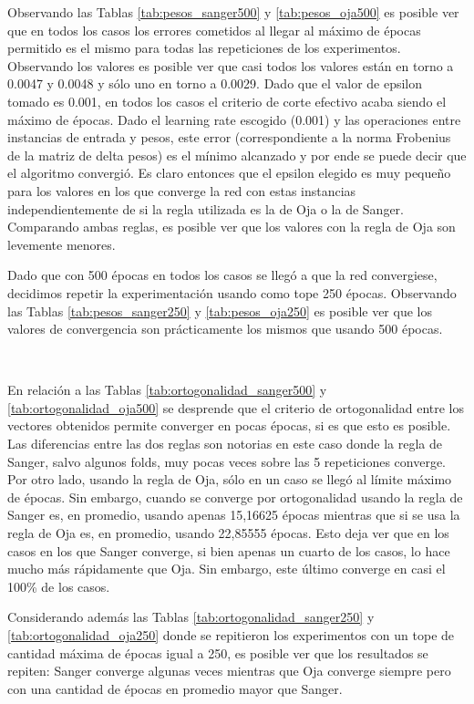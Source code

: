 \documentclass[informe.tex]{subfiles}
\begin{document}
	
	Observando las Tablas \ref{tab:pesos_sanger500} y \ref{tab:pesos_oja500} es posible ver que en todos los casos los errores cometidos al llegar al máximo de épocas permitido es el mismo para todas las repeticiones de los experimentos. Observando los valores es posible ver que casi todos los valores están en torno a 0.0047 y 0.0048 y sólo uno en torno a 0.0029. Dado que el valor de epsilon tomado es 0.001, en todos los casos el criterio de corte efectivo acaba siendo el máximo de épocas. Dado el learning rate escogido (0.001) y las operaciones entre instancias de entrada y pesos, este error (correspondiente a la norma Frobenius de la matriz de delta pesos) es el mínimo alcanzado y por ende se puede decir que el algoritmo convergió. Es claro entonces que el epsilon elegido es muy pequeño para los valores en los que converge la red con estas instancias independientemente de si la regla utilizada es la de Oja o la de Sanger. Comparando ambas reglas, es posible ver que los valores con la regla de Oja son levemente menores.
	
	Dado que con 500 épocas en todos los casos se llegó a que la red convergiese, decidimos repetir la experimentación usando como tope 250 épocas. Observando las Tablas \ref{tab:pesos_sanger250} y \ref{tab:pesos_oja250} es posible ver que los valores de convergencia son prácticamente los mismos que usando 500 \'epocas. 
	
	~
	
	En relación a las Tablas \ref{tab:ortogonalidad_sanger500} y \ref{tab:ortogonalidad_oja500} se desprende que el criterio de ortogonalidad entre los vectores obtenidos permite converger en pocas épocas, si es que esto es posible. Las diferencias entre las dos reglas son notorias en este caso donde la regla de Sanger, salvo algunos folds, muy pocas veces sobre las 5 repeticiones converge. Por otro lado, usando la regla de Oja, sólo en un caso se llegó al límite máximo de épocas. Sin embargo, cuando se converge por ortogonalidad usando la regla de Sanger es, en promedio, usando apenas 15,16625 épocas mientras que si se usa la regla de Oja es, en promedio, usando 22,85555 épocas. Esto deja ver que en los casos en los que Sanger converge, si bien apenas un cuarto de los casos, lo hace mucho más rápidamente que Oja. Sin embargo, este último converge en casi el 100\% de los casos. 
	
	Considerando además las Tablas \ref{tab:ortogonalidad_sanger250} y \ref{tab:ortogonalidad_oja250} donde se repitieron los experimentos con un tope de cantidad máxima de épocas igual a 250, es posible ver que los resultados se repiten: Sanger converge algunas veces mientras que Oja converge siempre pero con una cantidad de épocas en promedio mayor que Sanger.
	
\end{document}
